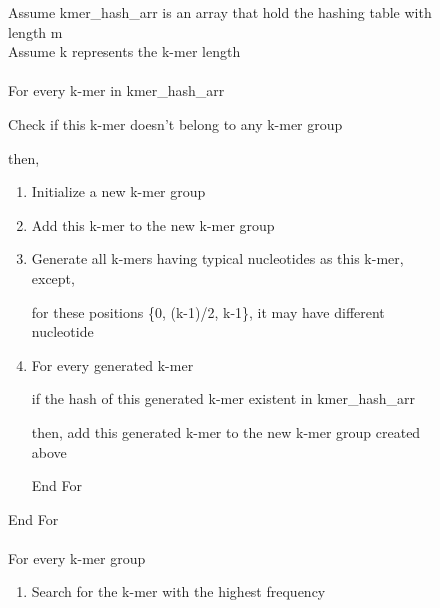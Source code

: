 \documentclass[12pt,openany]{llncs}
\begin{document}
\begin{figure}
\vspace{0.1cm}
\begin{bordered}
Assume kmer\_hash\_arr is an array that hold the hashing table  with length m
\\
Assume k represents the k-mer length
\\
\\
For every k-mer in kmer\_hash\_arr

\noindent\hspace{0.4cm} Check if this k-mer doesn't belong to any k-mer group

\noindent\hspace{0.4cm} then,

\vspace{-3mm}
\begin{enumerate}
\addtolength{\itemindent}{1cm}
	  \item Initialize a new k-mer group

	  \item Add this k-mer to the new k-mer group

      \item Generate all k-mers having typical nucleotides as this k-mer, except,
      
      \noindent\hspace{1cm} for these positions \{0, (k-1)/2, k-1\}, it may have different nucleotide
      
      \item For every generated k-mer
	
		\noindent\hspace{1.4cm} if the hash of this generated k-mer existent in kmer\_hash\_arr 
		
		\noindent\hspace{1.4cm} then, add this generated k-mer to the new k-mer group created above
		
		\noindent\hspace{1cm} End For

\end{enumerate}            
\vspace{-3mm}

End For
\\
\\
For every k-mer group 

\vspace{-3mm}
\begin{enumerate}
\addtolength{\itemindent}{1cm}
  \item Search for the k-mer with the highest frequency 


\end{enumerate}
\end{bordered}
\end{figure}
\end{document}
